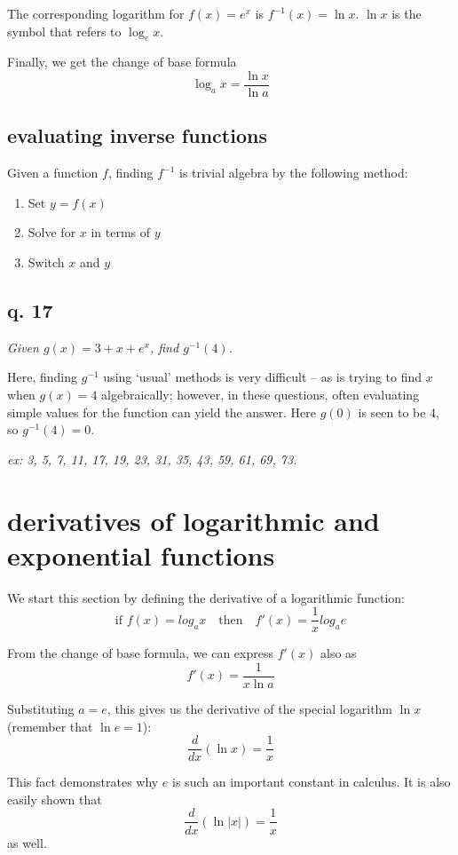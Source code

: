 \documentclass[10pt,a4paper]{report}
\begin{document}
The corresponding logarithm for $f(x) = e^x$ is $f^{-1}(x) = \ln x$. $\ln x$ is the symbol that refers to $\log_e x$.

Finally, we get the change of base formula
$$
	\log_a x = \frac{\ln x}{\ln a}
$$

\subsection{evaluating inverse functions}

Given a function $f$, finding $f^{-1}$ is trivial algebra by the following method:

\begin{enumerate}
	\item Set $y = f(x)$
	\item Solve for $x$ in terms of $y$
	\item Switch $x$ and $y$
\end{enumerate}

\subsection{q. 17}

\emph{Given $g(x) = 3 + x + e^x$, find $g^{-1}(4)$.}

Here, finding $g^{-1}$ using `usual' methods is very difficult -- as is trying to find $x$ when $g(x) = 4$ algebraically; however, in these questions, often evaluating simple values for the function can yield the answer. Here $g(0)$ is seen to be 4, so $g^{-1}(4) = 0$.

\emph{ex: 3, 5, 7, 11, 17, 19, 23, 31, 35, 43, 59, 61, 69, 73.}

\section{derivatives of logarithmic and exponential functions}

We start this section by defining the derivative of a logarithmic function:
$$
	\text{if } f(x) = log_a x \quad \text{then} \quad f'(x) = \frac{1}{x} log_a e
$$

From the change of base formula, we can express $f'(x)$ also as
$$
	f'(x) = \frac{1}{x \ln a}
$$

Substituting $a = e$, this gives us the derivative of the special logarithm $\ln x$ (remember that $\ln e = 1$):
$$
	\frac{d}{dx} (\ln x) = \frac{1}{x}
$$

This fact demonstrates why $e$ is such an important constant in calculus. It is also easily shown that
$$
	\frac{d}{dx} (\ln |x|) = \frac{1}{x}
$$
as well.
\end{document}
